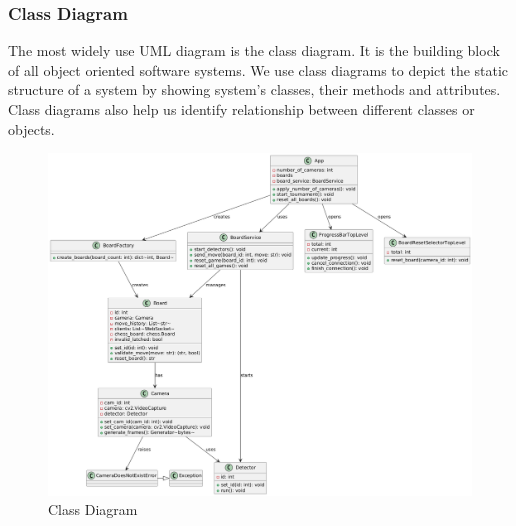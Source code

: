\newpage

\subsubsection*{Class Diagram}

The most widely use UML diagram is the class diagram. It is the building block of all object oriented software systems. We use class diagrams to depict the static structure of a system by showing system's classes, their methods and attributes. Class diagrams also help us identify relationship between different classes or objects.

\begin{figure}[h!]
    \centering
    \includegraphics[width=\linewidth]{figures/results//uml/class.png}
    \caption{Class Diagram}
    \label{fig:class}
\end{figure}

